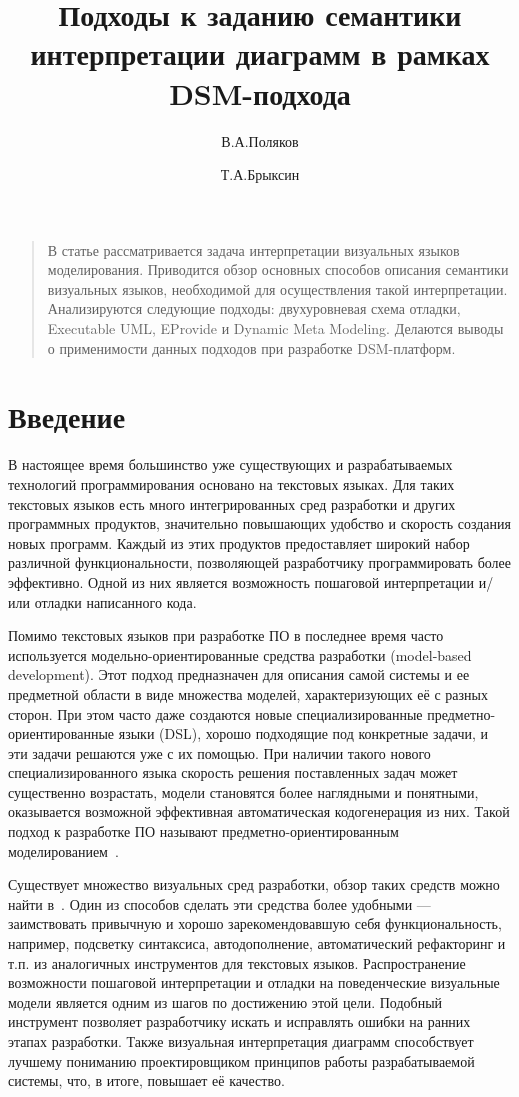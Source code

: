 \documentclass[a5paper]{article}
\title{Подходы к заданию семантики интерпретации диаграмм в рамках DSM-подхода}
\author{В.А.Поляков \and Т.А.Брыксин}
\date{}
\begin{document}
\maketitle
\thispagestyle{empty}

\begin{quote}
\small\noindent
В статье рассматривается задача интерпретации визуальных языков моделирования. Приводится обзор основных способов описания семантики визуальных языков, необходимой для осуществления такой интерпретации. Анализируются следующие подходы: двухуровневая схема отладки, Executable UML, EProvide и Dynamic Meta Modeling. Делаются выводы о применимости данных подходов при разработке DSM-платформ.
\end{quote}

\section*{Введение}

В настоящее время большинство уже существующих и разрабатываемых технологий программирования основано на текстовых языках. Для таких текстовых языков есть много интегрированных сред разработки и других программных продуктов, значительно повышающих удобство и скорость создания новых программ. Каждый из этих продуктов предоставляет широкий набор различной функциональности, позволяющей разработчику программировать более эффективно. Одной из них является возможность пошаговой интерпретации и/или отладки написанного кода.

Помимо текстовых языков при разработке ПО в последнее время часто используется модельно-ориентированные средства разработки (model-based development). Этот подход предназначен для описания самой системы и ее предметной области в виде множества моделей, характеризующих её с разных сторон. При этом часто даже создаются новые специализированные предметно-ориентированные языки (DSL), хорошо подходящие под конкретные задачи, и эти задачи решаются уже с их помощью. При наличии такого нового специализированного языка скорость решения поставленных задач может существенно возрастать, модели становятся более наглядными и понятными, оказывается возможной эффективная автоматическая кодогенерация из них. Такой подход к разработке ПО называют предметно-ориентированным моделированием~\cite{koznov1, koznov2, koznov4, koznov6, dsmbook}.

Существует множество визуальных сред разработки, обзор таких средств можно найти в~\cite{koznov3, koznov5}. Один из способов сделать эти средства более удобными --- заимствовать привычную и хорошо зарекомендовавшую себя функциональность, например, подсветку синтаксиса, автодополнение, автоматический рефакторинг и т.п. из аналогичных инструментов для текстовых языков. Распространение возможности пошаговой интерпретации и отладки на поведенческие визуальные модели является одним из шагов по достижению этой цели. Подобный инструмент позволяет разработчику искать и исправлять ошибки на ранних этапах разработки. Также визуальная интерпретация диаграмм способствует лучшему пониманию проектировщиком принципов работы разрабатываемой системы, что, в итоге, повышает её качество.
\end{document}
